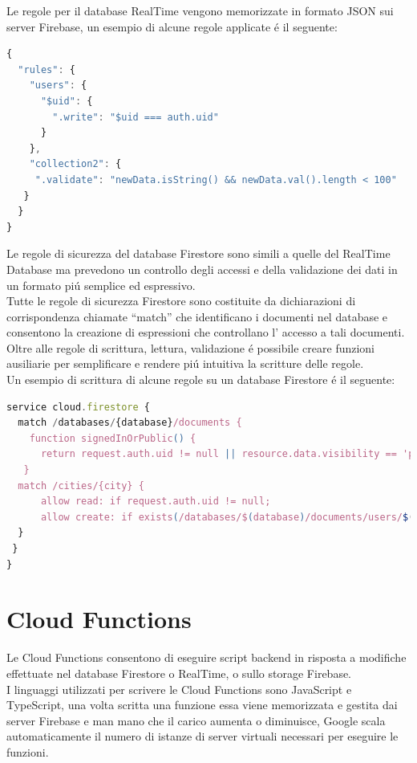Le regole per il database RealTime vengono memorizzate in formato JSON sui server Firebase, un esempio di alcune regole applicate \'e il seguente:


\begin{lstlisting}[language=javascript,caption={Firebase Rules esempio }]
{
  "rules": {
    "users": {
      "$uid": {
        ".write": "$uid === auth.uid"
      }
    },
    "collection2": {
     ".validate": "newData.isString() && newData.val().length < 100"
   }
  }
}
\end{lstlisting}




Le regole di sicurezza del database Firestore sono simili a quelle del RealTime Database ma prevedono un controllo degli accessi e della validazione dei dati in un formato pi\'u semplice ed espressivo.\\
Tutte le regole di sicurezza Firestore sono costituite da dichiarazioni di corrispondenza chiamate ``match'' che identificano i documenti nel database e consentono la creazione di espressioni che controllano l' accesso a tali documenti.\\
Oltre alle regole di scrittura, lettura, validazione \'e possibile creare funzioni ausiliarie per semplificare e rendere pi\'u intuitiva la scritture delle regole.\\
Un esempio di scrittura di alcune regole su un database Firestore \'e il seguente:

\begin{lstlisting}[language=javascript,caption={Firestore Database Rules}]
service cloud.firestore {
  match /databases/{database}/documents {
    function signedInOrPublic() {
      return request.auth.uid != null || resource.data.visibility == 'public';
   }
  match /cities/{city} {
      allow read: if request.auth.uid != null;
      allow create: if exists(/databases/$(database)/documents/users/$(request.auth.uid))
  }
 }
}
\end{lstlisting}



\section{Cloud Functions}                 %

Le Cloud Functions consentono di eseguire script backend in risposta a modifiche effettuate nel database Firestore o RealTime, o sullo storage Firebase.\\
I linguaggi utilizzati per scrivere le Cloud Functions sono JavaScript e TypeScript, una volta scritta una funzione essa viene memorizzata e gestita dai server Firebase e man mano che il carico aumenta o diminuisce, Google scala automaticamente il numero di istanze di server virtuali necessari per eseguire le funzioni.


